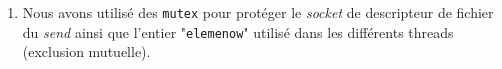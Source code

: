 \documentclass[11pt]{article}
\begin{document}
\begin{enumerate}
\smallskip
\item Nous avons utilisé des \texttt{mutex} pour protéger le \textit{socket} de descripteur de fichier du \textit{send} ainsi que l'entier "\texttt{elemenow}" utilisé dans les différents threads (exclusion mutuelle).
\end{enumerate}

\end{document}

